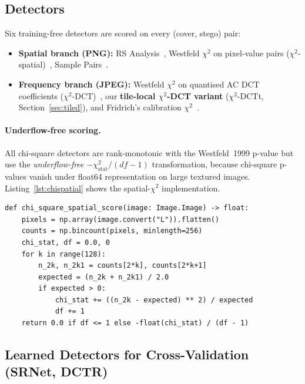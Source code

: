 \documentclass[10pt,twocolumn,a4paper]{article}
\begin{document}
\subsection{Detectors}
\label{sec:detectors}

Six training-free detectors are scored on every (cover, stego) pair:
\begin{itemize}
\item \textbf{Spatial branch (PNG):} RS Analysis~\cite{fridrich2001lsb}, Westfeld $\chi^2$ on pixel-value pairs ($\chi^2$-spatial)~\cite{westfeld1999chi}, Sample Pairs~\cite{dumitrescu2003sp}.
\item \textbf{Frequency branch (JPEG):} Westfeld $\chi^2$ on quantised AC DCT coefficients ($\chi^2$-DCT)~\cite{westfeld1999chi}, our \textbf{tile-local $\chi^2$-DCT variant} ($\chi^2$-DCTt, Section~\ref{sec:tiled}), and Fridrich's calibration $\chi^2$~\cite{fridrich2003calib}.
\end{itemize}

\paragraph{Underflow-free scoring.} All chi-square detectors are rank-monotonic with the Westfeld~1999 p-value but use the \emph{underflow-free} $-\chi^2_\text{stat}/(df\!-\!1)$ transformation, because chi-square p-values vanish under float64 representation on large textured images. Listing~\ref{lst:chispatial} shows the spatial-$\chi^2$ implementation.

\begin{lstlisting}[label={lst:chispatial},caption={Spatial $\chi^2$ (Westfeld~1999) on a grayscale image, with the underflow-free score transformation. The classical p-value is replaced by $-\chi^2/df$ which is rank-monotonic with the p-value on non-degenerate inputs but does not collapse to zero on large textured images.}]
def chi_square_spatial_score(image: Image.Image) -> float:
    pixels = np.array(image.convert("L")).flatten()
    counts = np.bincount(pixels, minlength=256)
    chi_stat, df = 0.0, 0
    for k in range(128):
        n_2k, n_2k1 = counts[2*k], counts[2*k+1]
        expected = (n_2k + n_2k1) / 2.0
        if expected > 0:
            chi_stat += ((n_2k - expected) ** 2) / expected
            df += 1
    return 0.0 if df <= 1 else -float(chi_stat) / (df - 1)
\end{lstlisting}

\subsection{Learned Detectors for Cross-Validation (SRNet, DCTR)}
\label{sec:learned-detectors}
\end{document}
